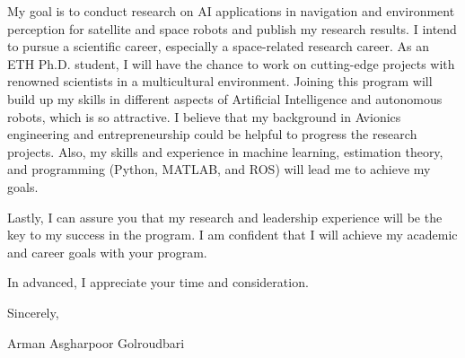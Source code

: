 \documentclass[a4,15pt]{article}
\begin{document}
\begin{large}
\quad My goal is to conduct research on AI applications in navigation and environment perception for satellite and space robots and publish my research results. I intend to pursue a scientific career, especially a space-related research career. As an ETH Ph.D. student, I will have the chance to work on cutting-edge projects with renowned scientists in a multicultural environment. Joining this program will build up my skills in different aspects of Artificial Intelligence and autonomous robots, which is so attractive. I believe that my background in Avionics engineering and entrepreneurship could be helpful to progress the research projects. Also, my skills and experience in machine learning, estimation theory, and programming (Python, MATLAB, and ROS) will lead me to achieve my goals. \par

\quad Lastly, I can assure you that my research and leadership experience will be the key to my success in the program. I am confident that I will achieve my academic and career goals with your program. \par


      \vspace{1cm}
      In advanced, I appreciate your time and consideration. \par
      Sincerely,\par
      Arman Asgharpoor Golroudbari
      \end{large}

 


\end{document}
